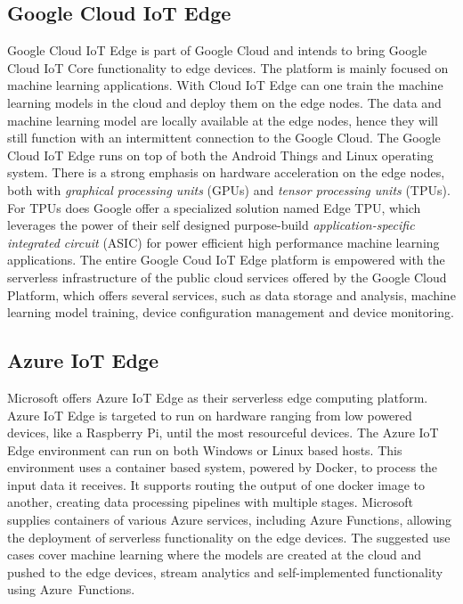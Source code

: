 \documentclass[article]{aaltoseries}
\begin{document}
\subsection{Google Cloud IoT Edge}
Google Cloud IoT Edge is part of Google Cloud and intends to bring Google Cloud IoT Core functionality to edge devices.
The platform is mainly focused on machine learning applications.
With Cloud IoT Edge can one train the machine learning models in the cloud and deploy them on the edge nodes. 
The data and machine learning model are locally available at the edge nodes, hence they will still function with an intermittent connection to the Google Cloud. %
The Google Cloud IoT Edge runs on top of both the Android Things and Linux operating system. %
There is a strong emphasis on hardware acceleration on the edge nodes, both with \emph{graphical processing units} (GPUs) and \emph{tensor processing units} (TPUs). %
For TPUs does Google offer a specialized solution named Edge TPU\texttrademark, which leverages the power of their self designed purpose-build \emph{application-specific integrated circuit} (ASIC) for power efficient high performance machine learning applications. %
The entire Google Coud IoT Edge platform is empowered with the serverless infrastructure of the public cloud services offered by the Google Cloud Platform, which offers several services, such as data storage and analysis, machine learning model training, device configuration management and device monitoring. %

\subsection{Azure IoT Edge} %
Microsoft offers Azure IoT Edge as their serverless edge computing platform.
Azure IoT Edge is targeted to run on hardware ranging from low powered devices, like a Raspberry Pi, until the most resourceful devices.
The Azure IoT Edge environment can run on both Windows or Linux based hosts.
This environment uses a container based system, powered by Docker, to process the input data it receives.
It supports routing the output of one docker image to another, creating data processing pipelines with multiple stages.
Microsoft supplies containers of various Azure services, including Azure Functions, allowing the deployment of serverless functionality on the edge devices.
The suggested use cases cover machine learning where the models are created at the cloud and pushed to the edge devices, stream analytics and self-implemented functionality using Azure~Functions. %
\end{document}
